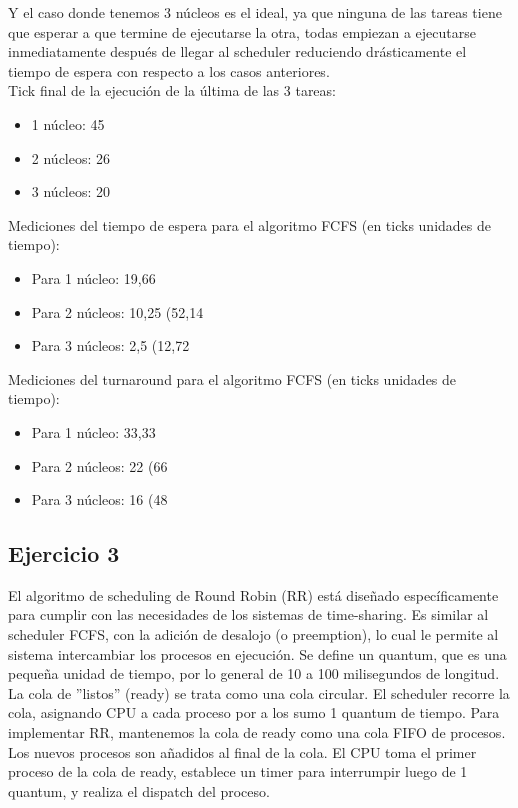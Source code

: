 Y el caso donde tenemos 3 núcleos es el ideal, ya que ninguna de las tareas tiene que esperar a que termine de ejecutarse la otra, todas empiezan a ejecutarse inmediatamente después de llegar al scheduler reduciendo drásticamente el tiempo de espera con respecto a los casos anteriores. \\

\noindent
Tick final de la ejecución de la última de las 3 tareas:
\begin{itemize}
	\item 1 núcleo: 45
	\item 2 núcleos: 26
	\item 3 núcleos: 20
\end{itemize}

\noindent
Mediciones del tiempo de espera para el algoritmo FCFS (en ticks unidades de tiempo):
\begin{itemize}
	\item Para 1 núcleo: 19,66
	\item Para 2 núcleos: 10,25 (52,14%
	\item Para 3 núcleos: 2,5 (12,72%
\end{itemize}

\noindent
Mediciones del turnaround para el algoritmo FCFS (en ticks unidades de tiempo):
\begin{itemize}
	\item Para 1 núcleo: 33,33
	\item Para 2 núcleos: 22 (66%
	\item Para 3 núcleos: 16 (48%
\end{itemize}


\subsection{Ejercicio 3}

\noindent

El algoritmo de scheduling de Round Robin\cite{silberschatz2009operating} (RR) está diseñado específicamente para cumplir con las necesidades de los sistemas de time-sharing. Es similar al scheduler FCFS, con la adición de desalojo (o preemption), lo cual le permite al sistema intercambiar los procesos en ejecución. Se define un quantum, que es una pequeña unidad de tiempo, por lo general de 10 a 100 milisegundos de longitud. La cola de ''listos'' (ready) se trata como una cola circular. El scheduler recorre la cola, asignando CPU a cada proceso por a los sumo 1 quantum de tiempo.
Para implementar RR, mantenemos la cola de ready como una cola FIFO de procesos. Los nuevos procesos son añadidos al final de la cola.  El CPU toma el primer proceso de la cola de ready, establece un timer para interrumpir luego de 1 quantum, y realiza el dispatch del proceso. \\

